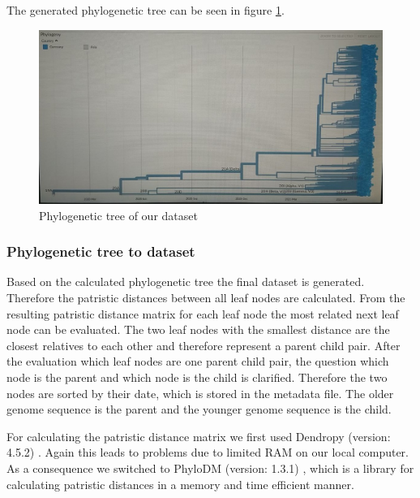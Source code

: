 The generated phylogenetic tree can be seen in figure \ref{phylogeneticTree}.

\begin{figure}[ht]
	\centering
	\includegraphics[width=1.0\linewidth]{figures/phylogeneticTree.jpg}
	\caption{Phylogenetic tree of our dataset \cite{own representation}}
	\label{phylogeneticTree}
\end{figure}

\subsubsection{Phylogenetic tree to dataset}
\label{ch:approachAc}

Based on the calculated phylogenetic tree the final dataset is generated. Therefore the patristic distances between all leaf nodes are calculated. From the resulting patristic distance matrix for each leaf node the most related next leaf node can be evaluated. The two leaf nodes with the smallest distance are the closest relatives to each other and therefore represent a parent child pair. After the evaluation which leaf nodes are one parent child pair, the question which node is the parent and which node is the child is clarified. Therefore the two nodes are sorted by their date, which is stored in the metadata file. The older genome sequence is the parent and the younger genome sequence is the child.

For calculating the patristic distance matrix we first used Dendropy (version: 4.5.2) \cite{DendroPyPhylogeneticComputing}. Again this leads to problems due to limited RAM on our local computer. As a consequence we switched to PhyloDM (version: 1.3.1) \cite{aaron_mussig_2020_4089111}, which is a library for calculating patristic distances in a memory and time efficient manner.

